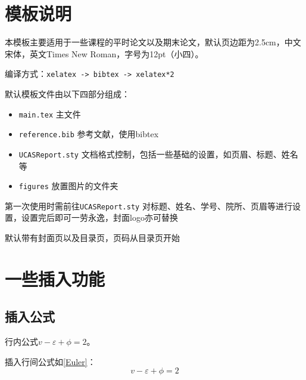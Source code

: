 \documentclass[12pt,hyperref,a4paper,UTF8,fontset=fandol]{ctexart}
\begin{document}
\cover

%
%

\thispagestyle{empty} %

\newpage
\tableofcontents

\newpage


\section{模板说明}
本模板主要适用于一些课程的平时论文以及期末论文，默认页边距为2.5cm，中文宋体，英文Times New Roman，字号为12pt（小四）。

编译方式：\verb|xelatex -> bibtex -> xelatex*2|


默认模板文件由以下四部分组成：
\begin{itemize}
    \item \texttt{main.tex} 主文件
    \item \texttt{reference.bib} 参考文献，使用bibtex
    \item \texttt{UCASReport.sty} 文档格式控制，包括一些基础的设置，如页眉、标题、姓名等
    \item \texttt{figures} 放置图片的文件夹
\end{itemize}

第一次使用时需前往\texttt{UCASReport.sty} 对标题、姓名、学号、院所、页眉等进行设置，设置完后即可一劳永逸，封面logo亦可替换

默认带有封面页以及目录页，页码从目录页开始

\section{一些插入功能}
\subsection{插入公式}
行内公式$v-\varepsilon+\phi=2$。

插入行间公式如\autoref{Euler}：
\begin{equation}
    v-\varepsilon+\phi=2
    \label{Euler}
\end{equation}
\end{document}
